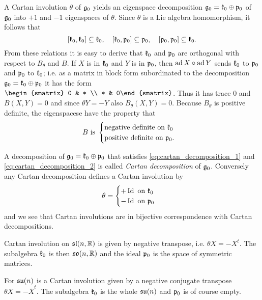 A Cartan involution $\theta$ of $\mathfrak{g}_0$ yields an eigenspace decomposition $\mathfrak{g}_0 = \mathfrak{k}_0 \oplus \mathfrak{p}_0$ of $\mathfrak{g}_0$ into $+1$ and $-1$ eigenspaces of $\theta$. Since $\theta$ is a Lie algebra homomorphism, it follows that
\begin{equation}\label{eq:cartan_decomposition_1}
 [\mathfrak{k}_0,\mathfrak{k}_0] \subseteq \mathfrak{k}_0, \quad[\mathfrak{k}_0,\mathfrak{p}_0] \subseteq \mathfrak{p}_0, \quad [\mathfrak{p}_0,\mathfrak{p}_0] \subseteq \mathfrak{k}_0.
\end{equation}
From these relations it is easy to derive that $\mathfrak{k}_0$ and $\mathfrak{p}_0$ are orthogonal with respect to $B_\theta$ and $B$. If $X$ is in $\mathfrak{k}_0$ and $Y$ is in $\mathfrak{p}_0$, then $\operatorname{\mathrm{ad}} X \circ \operatorname{\mathrm{ad}} Y $ sends $\mathfrak{k}_0$ to $\mathfrak{p}_0$ and $\mathfrak{p}_0$ to $\mathfrak{k}_0$; i.e. as a matrix in block form subordinated to the decomposition $\mathfrak{g}_0 = \mathfrak{k}_0 \oplus \mathfrak{p}_0$ it has the form $\begin{smatrix} 0 & * \\ * & 0\end{smatrix}$. Thus it has trace $0$ and $B(X,Y) = 0$ and since $\theta Y = - Y$ also $B_\theta (X,Y) = 0$. Because $B_\theta$ is positive definite, the eigenspacese have the property that
\begin{equation}\label{eq:cartan_decomposition_2}
 B \text{ is } \begin{cases} \text{negative definite on } \mathfrak{k}_0 \\ \text{positive definite on } \mathfrak{p}_0. \end{cases}
\end{equation}

A decomposition of $\mathfrak{g}_0 = \mathfrak{k}_0 \oplus \mathfrak{p}_0$ that satisfies \eqref{eq:cartan_decomposition_1} and \eqref{eq:cartan_decomposition_2} is called \emph{Cartan decomposition} of $\mathfrak{g}_0$. Conversely any Cartan decomposition defines a Cartan involution by
\[
\theta =
 \begin{cases}
  + \operatorname{\mathrm{Id}} \text{ on } \mathfrak{k}_0 \\
  - \operatorname{\mathrm{Id}} \text{ on } \mathfrak{p}_0
 \end{cases}
\]
and we see that Cartan involutions are in bijective correspondence with Cartan decompositions.


\begin{example}
  Cartan involution on $\mathfrak{sl}(n,\mathbb{R})$ is given by negative transpose, i.e. $\theta X = - X^t$. The subalgebra $\mathfrak{k}_0$ is then $\mathfrak{so}(n,\mathbb{R})$ and the ideal $\mathfrak{p}_0$ is the space of symmetric matrices.

 For $\mathfrak{su}(n)$ is a Cartan involution given by a negative conjugate transpose $\theta X = - \overline{X}^t$. The subalgebra $\mathfrak{k}_0$ is the whole $\mathfrak{su}(n)$ and $\mathfrak{p}_0$ is of course empty.
\end{example}

